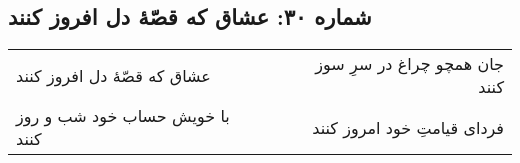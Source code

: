 \begin{center}
\section*{شماره ۳۰: عشاق که قصّۀ دل افروز کنند}
\label{sec:030}
\begin{longtable}{l p{0.5cm} r}
عشاق که قصّهٔ دل افروز کنند
&&
جان همچو چراغ در سرِ سوز کنند
\\
با خویش حساب خود شب و روز کنند
&&
فردای قیامتِ خود امروز کنند
\\
\end{longtable}
\end{center}
